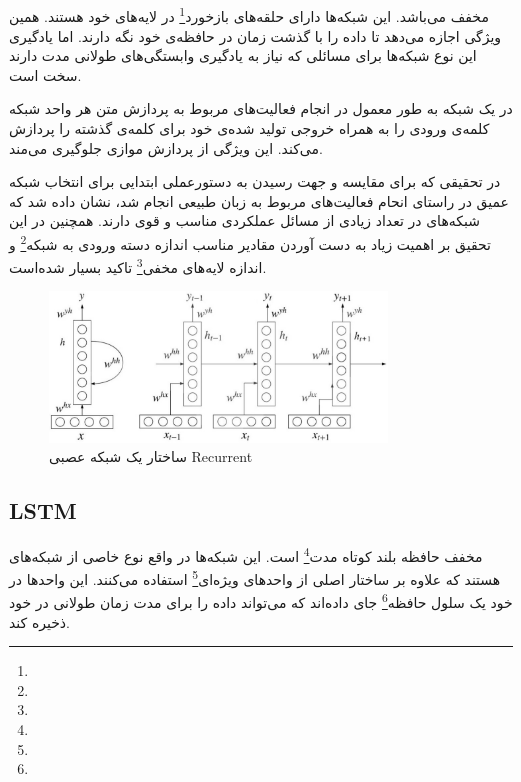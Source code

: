 \documentclass[12pt, a4paper, oneside]{report}
\begin{document}
\subsection{}

مخفف
می‌باشد. این شبکه‌ها دارای حلقه‌های
بازخورد\footnote{}
در لایه‌های خود هستند. همین ویژگی اجازه می‌دهد تا داده را با گذشت زمان در حافظه‌ی خود نگه دارند.
اما یادگیری این نوع شبکه‌ها برای مسائلی که نیاز به یادگیری وابستگی‌های طولانی مدت دارند سخت است.

در یک شبکه
به طور معمول در انجام فعالیت‌های مربوط به پردازش متن هر واحد شبکه کلمه‌ی ورودی را به همراه
خروجی تولید شده‌ی خود برای کلمه‌ی گذشته را پردازش می‌کند. این ویژگی از پردازش موازی جلوگیری می‌مند\cite{iyyer-etal-2015-deep}.

در تحقیقی که برای مقایسه
و
جهت رسیدن به دستورعملی ابتدایی برای انتخاب شبکه عمیق در راستای انحام فعالیت‌های مربوط به زبان طبیعی
انجام شد، نشان داده شد که شبکه‌های
در تعداد زیادی از مسائل عملکردی مناسب و قوی دارند. همچنین در این تحقیق بر اهمیت زیاد به دست آوردن
مقادیر مناسب
اندازه دسته ورودی به شبکه\footnote{}
و
اندازه لایه‌های مخفی\footnote{}
تاکید بسیار شده‌است\cite{8844895}.

\begin{figure}[!ht]
    \centering
    \includegraphics[width=0.8\textwidth]{rnn}
    \caption{ساختار یک شبکه عصبی Recurrent}
    \label{fig:rnn}
\end{figure}

\subsection{LSTM}

مخفف
حافظه بلند کوتاه مدت\footnote{}
است. این شبکه‌ها در واقع نوع خاصی از شبکه‌های
هستند که علاوه بر ساختار اصلی از 
واحد‌های ویژه‌ای\footnote{}
استفاده می‌کنند. این واحدها در خود یک 
سلول حافظه\footnote{}
جای داده‌اند که می‌تواند داده را برای مدت زمان طولانی در خود ذخیره کند.
\end{document}
